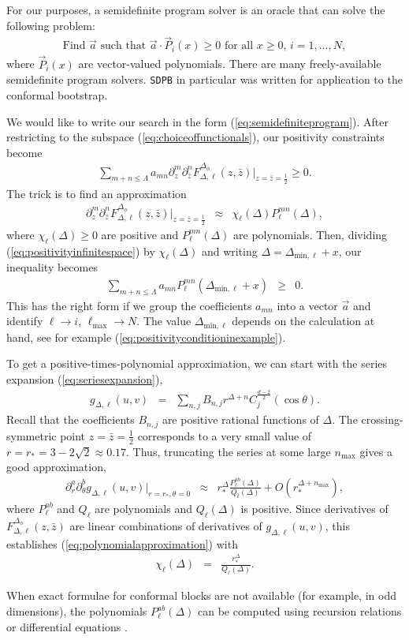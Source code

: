 \documentclass{ws-rv9x6}
\newif\ifarxivsubmission
\newcommand\be{\begin{eqnarray}}
\newcommand\ee{\end{eqnarray}}
\newcommand\f\phi
\newcommand\ptl\partial
\newcommand\<\langle
\renewcommand\>\rangle
\renewcommand\.{\cdot}
\newcommand\De{\Delta}
\renewcommand\th{\theta}
\begin{document}
\begin{appendix}
\label{app:semidefinite}

For our purposes, a semidefinite program solver is an oracle that can solve the following problem:
\be
\label{eq:semidefiniteprogram}
\textrm{Find $\vec a$ such that $\vec a \. \vec P_i(x) \geq 0$ for all $x\geq 0$, $i=1,\dots,N$},
\ee
where $\vec P_i(x)$ are vector-valued polynomials.  There are many freely-available semidefinite program solvers.  {\tt SDPB} \cite{Simmons-Duffin:2015qma} in particular was written for application to the conformal bootstrap.

We would like to write our search in the form (\ref{eq:semidefiniteprogram}).
After restricting to the subspace (\ref{eq:choiceoffunctionals}), our positivity constraints become
\be
\label{eq:positivityinfinitespace}
\sum_{m+n\leq \Lambda} a_{mn}\ptl_z^m \ptl_{\bar z}^n F_{\De,\ell}^{\De_\f}(z,\bar z)|_{z=\bar z = \frac 1 2} \geq 0.
\ee
The trick is to find an approximation
\be
\label{eq:polynomialapproximation}
\ptl_z^m \ptl_{\bar z}^n F_{\De,\ell}^{\De_\f}(z,\bar z)|_{z=\bar z= \frac 1 2} &\approx& \chi_\ell(\De) P^{mn}_\ell(\De),
\ee
where $\chi_\ell(\De) \geq 0$ are positive and $P^{mn}_\ell(\De)$ are polynomials.  Then, dividing (\ref{eq:positivityinfinitespace}) by $\chi_\ell(\De)$ and writing $\De=\De_{\mathrm{min},\ell}+x$, our inequality becomes
\be
\sum_{m+n\leq \Lambda} a_{mn} P_\ell^{mn}(\De_{\mathrm{min},\ell}+x) &\geq& 0.
\ee
This has the right form if we group the coefficients $a_{mn}$ into a vector $\vec a$ and identify $\ell\to i$, $\ell_\mathrm{max}\to N$.  The value $\De_{\mathrm{min},\ell}$ depends on the calculation at hand, see for example (\ref{eq:positivityconditioninexample}).

To get a positive-times-polynomial approximation, we can start with the series expansion (\ref{eq:seriesexpansion}),
\be
g_{\De,\ell}(u,v) &=& \sum_{n,j} B_{n,j} r^{\De+n} C_j^{\frac{d-2}{2}}(\cos\th).
\ee
Recall that the coefficients $B_{n,j}$ are positive rational functions of $\De$.  The crossing-symmetric point $z=\bar z = \frac 1 2$ corresponds to a very small value of $r=r_*=3-2\sqrt 2 \approx 0.17$.  Thus, truncating the series at some large $n_\mathrm{max}$ gives a good approximation,
\be
\ptl_r^a \ptl_\th^b g_{\De,\ell}(u,v)|_{r=r_*,\th=0} &\approx & r_*^\De \frac{P^{ab}_\ell(\De)}{Q_\ell(\De)}  + O(r_*^{\De+n_\mathrm{max}}),
\ee
where $P^{ab}_\ell$ and $Q_\ell$ are polynomials and $Q_\ell(\De)$ is positive.  Since derivatives of $F_{\De,\ell}^{\De_\f}(z,\bar z)$ are linear combinations of derivatives of $g_{\De,\ell}(u,v)$, this establishes (\ref{eq:polynomialapproximation}) with
\be
\chi_\ell(\De) &=& \frac{r_*^\De}{Q_\ell(\De)}.
\ee

When exact formulae for conformal blocks are not available (for example, in odd dimensions), the polynomials $P^{ab}_\ell(\De)$ can be computed using recursion relations \cite{Zamolodchikov:1985ie,Zamolodchikov:1987,Kos:2013tga,Kos:2014bka,Penedones:2015aga,Yamazaki:2016vqi,Iliesiu:2015akf} or differential equations \cite{Hogervorst:2013kva}.

\end{appendix}



\ifarxivsubmission
\else
  \blankpage
\fi
\printindex
\end{document}

